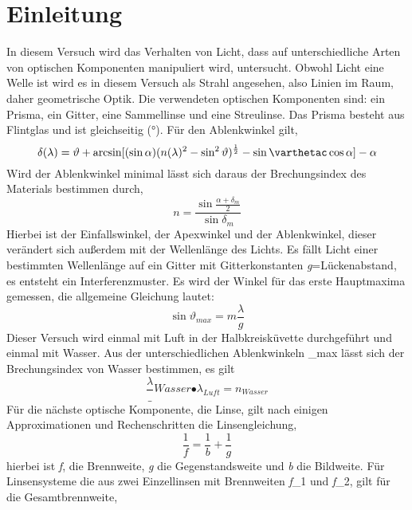 \section{Einleitung}
In diesem Versuch wird das Verhalten von Licht, dass auf unterschiedliche Arten von optischen Komponenten manipuliert wird, untersucht.
Obwohl Licht eine Welle ist wird es in diesem Versuch als Strahl angesehen, also Linien im Raum, daher geometrische Optik.
Die verwendeten optischen Komponenten sind: ein Prisma, ein Gitter, eine Sammellinse und eine Streulinse.
Das Prisma besteht aus Flintglas und ist gleichseitig (°).
Für den Ablenkwinkel gilt,
\begin{equation}
\delta(\lambda)=\vartheta+\arcsin [(\sin \alpha)(n(\lambda)^{2}-\sin^{2}\vartheta)^{\frac{1}{2}}-\sin\varthetac \cos\alpha]-\alpha \label{eq:delta}
\end{equation}
Wird der Ablenkwinkel minimal lässt sich daraus der Brechungsindex des Materials bestimmen durch,
\begin{equation}
n = \frac{\sin \frac{\alpha + \delta_m}{2}}{\sin \delta_m} \label{eq:brech_pris}
\end{equation}
Hierbei ist \vartheta der Einfallswinkel, \alpha der Apexwinkel und \delta der Ablenkwinkel, dieser verändert sich außerdem mit der Wellenlänge des Lichts.
Es fällt Licht einer bestimmten Wellenlänge \lambda auf ein Gitter mit Gitterkonstanten \textit{g}=Lückenabstand, es entsteht ein Interferenzmuster.
Es wird der Winkel für das erste Hauptmaxima gemessen, die allgemeine Gleichung lautet:
\begin{equation}
\sin\vartheta_{max}=m\frac{\lambda}{g}
\end{equation}
Dieser Versuch wird einmal mit Luft in der Halbkreisküvette durchgeführt und einmal mit Wasser. Aus der unterschiedlichen Ablenkwinkeln \vartheta_{max} lässt sich der Brechungsindex von Wasser bestimmen, es gilt
\begin{equation}
\frac{\lambda}_{Wasser}{•\lambda_{Luft}}=n_{Wasser} \label{Brechungsindex_wasser}
\end{equation}
Für die nächste optische Komponente, die Linse, gilt nach einigen Approximationen und Rechenschritten die Linsengleichung,
\begin{equation}
\frac{1}{f}=\frac{1}{b}+\frac{1}{g} \label{Linsenglg}
\end{equation}
hierbei ist \textit{f}, die Brennweite, \textit{g} die Gegenstandsweite und \textit{b} die Bildweite.
Für Linsensysteme die aus zwei Einzellinsen mit Brennweiten \textit{f}_{1} und \textit{f}_{2}, gilt für die Gesamtbrennweite,
